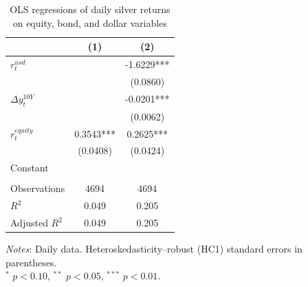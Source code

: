 \begin{table}[H]
\centering
\caption{OLS regressions of daily silver returns on equity, bond, and dollar variables}
\label{tab:ols_silver_equity}
\begin{tabular}{lcc}
\toprule
 & (1) & (2) \\
\midrule
$r^{usd}_t$ &  & -1.6229*** \\
 &  & (0.0860) \\
$\Delta y^{10Y}_t$ &  & -0.0201*** \\
 &  & (0.0062) \\
$r^{equity}_t$ & 0.3543*** & 0.2625*** \\
 & (0.0408) & (0.0424) \\
Constant &  &  \\
 &  &  \\
Observations & 4694 & 4694 \\
$R^2$ & 0.049 & 0.205 \\
Adjusted $R^2$ & 0.049 & 0.205 \\
\bottomrule
\end{tabular}

\vspace{0.2cm}
\begin{minipage}{0.9\textwidth}
\footnotesize
\textit{Notes}: Daily data. Heteroskedasticity--robust (HC1) standard errors in parentheses.\\
$^*$ $p<0.10$, $^{**}$ $p<0.05$, $^{***}$ $p<0.01$.
\end{minipage}
\end{table}
